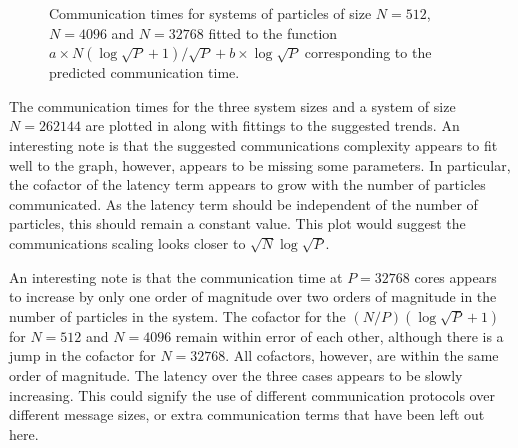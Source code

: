 \begin{figure}
    
    \caption{
        Communication times for systems of particles of size
        $N=512$, $N=4096$ and $N=32768$ fitted to the function
        $a\times{}N(\log{\sqrt{P}} + 1)/\sqrt{P} + b\times{}\log{\sqrt{P}}$
        corresponding to the predicted communication time.
    }
    \label{fig:replicated_systolic_communication_fits}
\end{figure}

The communication times for the three system sizes and a
system of size $N = 262144$ are plotted in
along with fittings to the suggested trends.
%
An interesting note is that the suggested communications complexity
appears to fit well to the graph, however, appears to be
missing some parameters.
%
In particular, the cofactor of the latency term appears to grow
with the number of particles communicated.
%
As the latency term should be independent of the number of particles,
this should remain a constant value.
%
This plot would suggest the communications scaling looks closer to
$\sqrt{N}\log{\sqrt{P}}$.


An interesting note is that the communication time at $P = 32768$ cores
appears to increase by only one order of magnitude over two orders
of magnitude in the number of particles in the system.
%
The cofactor for the $(N/P) (\log{\sqrt{P}}+1)$ for
$N = 512$ and $N = 4096$ remain within error of each other, although
there is a jump in the cofactor for $N = 32768$.
%
All cofactors, however, are within the same order of magnitude.
%
The latency over the three cases appears to be slowly increasing.
%
This could signify the use of different communication protocols
over different message sizes, or extra communication terms that
have been left out here.
